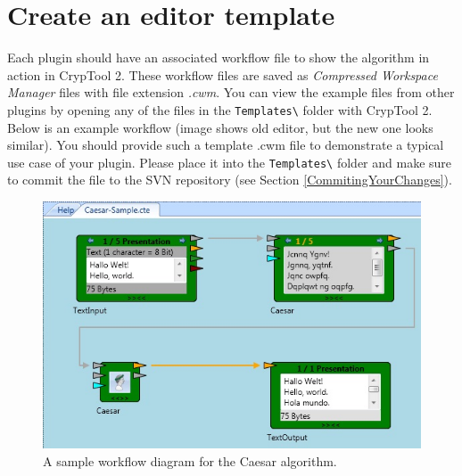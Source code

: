 \section{Create an editor template}
\label{DrawingTheWorkfloweOfYourPlugin}

Each plugin should have an associated workflow file to show the algorithm in action in CrypTool 2. These workflow files are saved as \textit{Compressed Workspace Manager} files with file extension \textit{.cwm}. You can view the example files from other plugins by opening any of the files in the \texttt{Templates\textbackslash} folder with CrypTool 2. Below is an example workflow (image shows old editor, but the new one looks similar). You should provide such a template .cwm file to demonstrate a typical use case of your plugin. Please place it into the \texttt{Templates\textbackslash} folder and make sure to commit the file to the SVN repository (see Section \ref{CommitingYourChanges}).

\begin{figure}[h]
	\centering
		\includegraphics{figures/sample.jpg}
	\caption{A sample workflow diagram for the Caesar algorithm.}
	\label{fig:sample}
\end{figure}
